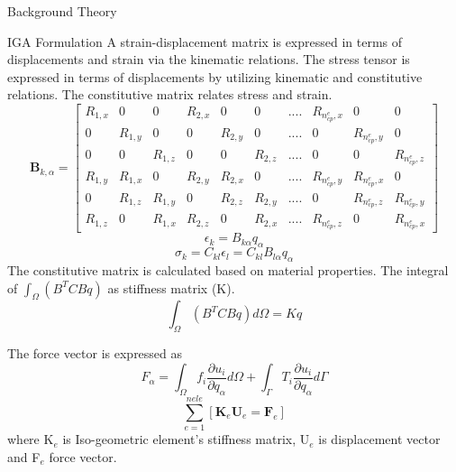 \documentclass[a4paper,12pt,times]{article}
\begin{document}
\begin{section}{Background Theory}
\begin{subsection}{IGA Formulation}
A strain-displacement matrix is expressed in terms of displacements
and strain via the kinematic relations.
The stress tensor is expressed in terms of displacements by utilizing
kinematic and constitutive relations. The constitutive matrix relates stress and strain.
\begin{equation} \label{BMatrix}
\textbf{B}_{k,\alpha} =
\begin{bmatrix}
R_{1,x} & 0 & 0 & R_{2,x} & 0 & 0 & .... & R_{n_{cp}^e,x} & 0 & 0 \\
0 &R_{1,y} & 0 & 0 & R_{2,y} & 0 & .... & 0 & R_{n_{cp}^e,y} & 0  \\
0 & 0 & R_{1,z} &0 & 0 & R_{2,z} & .... &0 & 0 & R_{n_{cp}^e,z}  \\
R_{1,y} & R_{1,x} & 0 & R_{2,y} & R_{2,x} & 0 & .... & R_{n_{cp}^e,y} &
R_{n_{cp}^e,x} & 0 \\
0 & R_{1,z} & R_{1,y} & 0 & R_{2,z} & R_{2,y} & .... & 0 & R_{n_{cp}^e,z} &
R_{n_{cp}^e,y}\\
R_{1,z} &0 & R_{1,x} & R_{2,z} &0 & R_{2,x} & .... &R_{n_{cp}^e,z} &0
&R_{n_{cp}^e,x}
\end{bmatrix}
\end{equation}
\begin{equation}
\epsilon_{k}=B_{k \alpha} q_{\alpha}
\end{equation}
\begin{equation}
\sigma_{k}=C_{k l} \epsilon_{l}=C_{k l} B_{l \alpha} q_{\alpha}
\end{equation}
The constitutive matrix is calculated based on material properties.
The integral of $\int_{\Omega}\left(B^{T} C B q\right)$ as stiffness matrix (K).
\begin{equation}\label{stiffness matrix}
\int_{\Omega}\left(B^{T} C B q\right) d \Omega=K q
\end{equation}

The force vector is expressed as 
\begin{equation}\label{force vector}
F_{\alpha}=\int_{\Omega} f_{i} \frac{\partial u_{i}}{\partial q_{\alpha}} d \Omega+\int_{\Gamma} T_{i} \frac{\partial u_{i}}{\partial q_{\alpha}} d \Gamma
\end{equation}
\begin{equation}
\sum_{e=1}^{n e l e}\left[\mathbf{K}_{e} \mathbf{U}_{e}=\mathbf{F}_{e}\right]
\end{equation}
where K$_{e}$ is Iso-geometric element's stiffness matrix, U$_e$ is displacement vector and F$_e$ force
vector.

\end{subsection}



\end{section}
\end{document}
